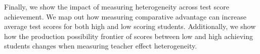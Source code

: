 \documentclass[12pt]{article}
\theoremstyle{definition}
\theoremstyle{definition}
\theoremstyle{definition}
\theoremstyle{definition}
\begin{document}
    Finally, we show the impact of measuring heterogeneity across test score achievement. We map out how measuring comparative advantage can increase average test scores for both high and low scoring students. Additionally, we show how the production possibility frontier of scores between low and high achieving students changes when measuring teacher effect heterogeneity. 
    

\end{document}

